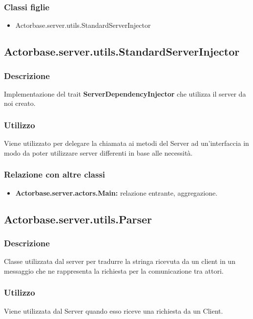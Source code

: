 \documentclass[a4paper]{article}
\begin{document}
			\subsubsection{Classi figlie}
				\begin{itemize}
					\item Actorbase.server.utils.StandardServerInjector
				\end{itemize}
		
		\subsection{Actorbase.server.utils.StandardServerInjector}
			\subsubsection{Descrizione}
				Implementazione del trait \textbf{ServerDependencyInjector} che utilizza il server da noi creato.
				
			\subsubsection{Utilizzo}
				Viene utilizzato per delegare la chiamata ai metodi del Server ad un'interfaccia in modo da poter utilizzare server differenti in base 
				alle necessità.				
				
			\subsubsection{Relazione con altre classi}
				\begin{itemize}
					\item \textbf{Actorbase.server.actors.Main:} relazione entrante, aggregazione.
				\end{itemize}
			
		\subsection{Actorbase.server.utils.Parser}
			\subsubsection{Descrizione}
				Classe utilizzata dal server per tradurre la stringa ricevuta da un client in un messaggio che ne rappresenta la richiesta per la 
				comunicazione tra attori.
				
			\subsubsection{Utilizzo}
				Viene utilizzata dal Server quando esso riceve una richiesta da un Client.
				
\end{document}
